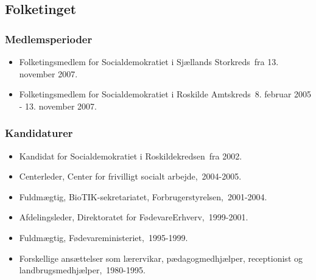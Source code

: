\documentclass[11pt, a4paper]{awesome-cv}
\begin{document}
\begin{cvletter}
\subsection*{Folketinget}
\subsubsection*{Medlemsperioder}
\begin{itemize}
\item Folketingsmedlem for Socialdemokratiet i Sjællands Storkreds fra 13. november 2007.
\item Folketingsmedlem for Socialdemokratiet i Roskilde Amtskreds 8. februar 2005 - 13. november 2007.
\end{itemize}
\subsubsection*{Kandidaturer}
\begin{itemize}
\item Kandidat for Socialdemokratiet i Roskildekredsen fra 2002.
\end{itemize}
\begin{itemize}
\item Centerleder, Center for frivilligt socialt arbejde, 2004-2005.
\item Fuldmægtig, BioTIK-sekretariatet, Forbrugerstyrelsen, 2001-2004.
\item Afdelingsleder, Direktoratet for FødevareErhverv, 1999-2001.
\item Fuldmægtig, Fødevareministeriet, 1995-1999.
\item Forskellige ansættelser som lærervikar, pædagogmedhjælper, receptionist og landbrugsmedhjælper, 1980-1995.
\end{itemize}
\end{cvletter}
\end{document}
